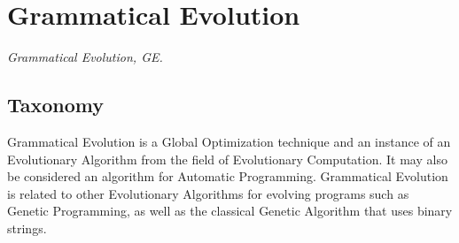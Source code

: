 

\section{Grammatical Evolution} 
\label{sec:grammatical_evolution}

\emph{Grammatical Evolution, GE.}

\subsection{Taxonomy}
Grammatical Evolution is a Global Optimization technique and an instance of an Evolutionary Algorithm from the field of Evolutionary Computation. It may also be considered an algorithm for Automatic Programming.
Grammatical Evolution is related to other Evolutionary Algorithms for evolving programs such as Genetic Programming, as well as the classical Genetic Algorithm that uses binary strings.

